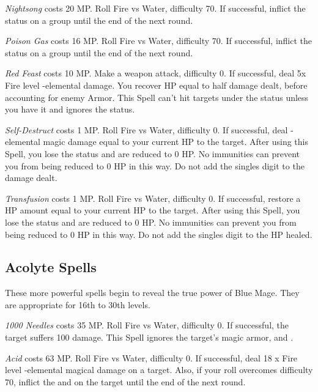 \begin{multicols}{2}
    \textit{Nightsong} costs 20 MP\@. Roll Fire vs Water, difficulty 70. If successful, inflict the  status on a group until the end of the next round.
    
    \textit{Poison Gas} costs 16 MP\@. Roll Fire vs Water, difficulty 70. If successful, inflict the  status on a group until the end of the next round.
    
    \textit{Red Feast} costs 10 MP\@. Make a weapon attack, difficulty 0. If successful, deal 5x Fire level -elemental damage. You recover HP equal to half damage dealt, before accounting for enemy Armor. This Spell can’t hit targets under the  status unless you have it and ignores the  status.
    
    \textit{Self-Destruct} costs 1 MP\@. Roll Fire vs Water, difficulty 0. If successful, deal -elemental magic damage equal to your current HP to the target. After using this Spell, you lose the  status and are reduced to 0 HP\@. No immunities can prevent you from being reduced to 0 HP in this way. Do not add the singles digit to the damage dealt.

    \textit{Transfusion} costs 1 MP\@. Roll Fire vs Water, difficulty 0. If successful, restore a HP amount equal to your current HP to the target. After using this Spell, you lose the  status and are reduced to 0 HP\@. No immunities can prevent you from being reduced to 0 HP in this way. Do not add the singles digit to the HP healed.
    
\subsection{Acolyte Spells}\label{subsec:blue-acolyte}

These more powerful spells begin to reveal the true power of Blue Mage. They are appropriate for 16th to 30th levels.

    \textit{1000 Needles} costs 35 MP\@. Roll Fire vs Water, difficulty 0. If successful, the target suffers 100 damage. This Spell ignores the target’s magic armor,  and .

    \textit{Acid} costs 63 MP\@. Roll Fire vs Water, difficulty 0. If successful, deal 18 x Fire level -elemental magical damage on a target. Also, if your roll overcomes difficulty 70, inflict the  and  on the target until the end of the next round.
    

\end{multicols}
